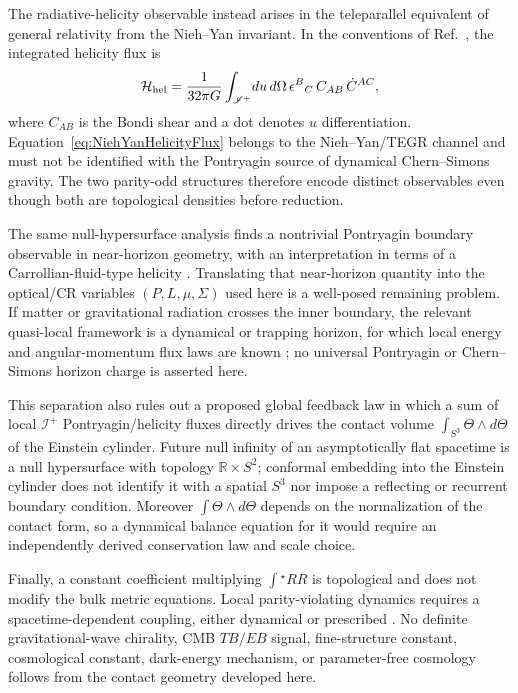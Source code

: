 \documentclass[aps,prd,reprint,nofootinbib,superscriptaddress]{revtex4-2}
\theoremstyle{definition}
\theoremstyle{remark}
\begin{document}
The radiative-helicity observable instead arises in the teleparallel equivalent of general relativity from the Nieh--Yan invariant. In the conventions of Ref.~\cite{LongZhou2026}, the integrated helicity flux is
\begin{equation}
 \mathcal H_{\rm hel}
 =\frac{1}{32\pi G}
 \int_{\mathscr I^+}\!du\,d\Omega\,
 \epsilon^{B}{}_{C}\,C_{AB}\,\dot C^{A C},
 \label{eq:NiehYanHelicityFlux}
\end{equation}
where $C_{AB}$ is the Bondi shear and a dot denotes $u$ differentiation. Equation~\eqref{eq:NiehYanHelicityFlux} belongs to the Nieh--Yan/TEGR channel and must not be identified with the Pontryagin source of dynamical Chern--Simons gravity. The two parity-odd structures therefore encode distinct observables even though both are topological densities before reduction.

The same null-hypersurface analysis finds a nontrivial Pontryagin boundary observable in near-horizon geometry, with an interpretation in terms of a Carrollian-fluid-type helicity \cite{LongZhou2026}. Translating that near-horizon quantity into the optical/CR variables $(P,L,\mu,\Sigma)$ used here is a well-posed remaining problem. If matter or gravitational radiation crosses the inner boundary, the relevant quasi-local framework is a dynamical or trapping horizon, for which local energy and angular-momentum flux laws are known \cite{AshtekarKrishnan2002,AshtekarKrishnan2004}; no universal Pontryagin or Chern--Simons horizon charge is asserted here.

This separation also rules out a proposed global feedback law in which a sum of local $\mathscr I^+$ Pontryagin/helicity fluxes directly drives the contact volume $\int_{S^3}\Theta\wedge d\Theta$ of the Einstein cylinder. Future null infinity of an asymptotically flat spacetime is a null hypersurface with topology $\mathbb R\times S^2$; conformal embedding into the Einstein cylinder does not identify it with a spatial $S^3$ nor impose a reflecting or recurrent boundary condition. Moreover $\int\Theta\wedge d\Theta$ depends on the normalization of the contact form, so a dynamical balance equation for it would require an independently derived conservation law and scale choice.

Finally, a constant coefficient multiplying $\int{}^{\star}RR$ is topological and does not modify the bulk metric equations. Local parity-violating dynamics requires a spacetime-dependent coupling, either dynamical or prescribed \cite{JackiwPi2003,AlexanderYunes2009}. No definite gravitational-wave chirality, CMB $TB/EB$ signal, fine-structure constant, cosmological constant, dark-energy mechanism, or parameter-free cosmology follows from the contact geometry developed here.
\end{document}
